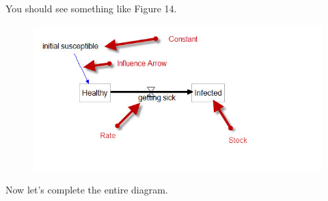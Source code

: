 \documentclass[11pt]{amsart}
\begin{document}
You should see something like Figure 14.



\begin{figure}[ht]
\begin{center}
\vspace{.2in}
\centerline {
\includegraphics[totalheight=0.15\textheight]{images/014.jpg}
}
\caption{}
\label{fig:014}
\end{center}
\end{figure}

Now let's complete the entire diagram.
\end{document}
